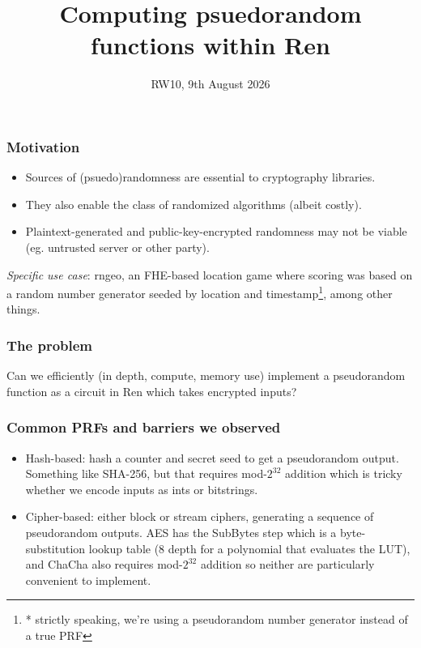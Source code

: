 \documentclass{beamer}
\title{Computing psuedorandom functions within Ren}
\author{}
\institute{Field Extension Institute}
\date{RW10, 9th August 2026}
\begin{document}
\frame{\titlepage}

\begin{frame}
\frametitle{Motivation}
\begin{itemize}[<+->]
    \item Sources of (psuedo)randomness are essential to cryptography libraries.
    \item They also enable the class of randomized algorithms (albeit costly).
    \item Plaintext-generated and public-key-encrypted randomness may not be viable (eg. untrusted server or other party).
\end{itemize}

\pause
\vspace{1cm}
\textit{Specific use case}: rngeo, an FHE-based location game where scoring was based on a random number generator seeded by location and timestamp\footnote{* strictly speaking, we're using a pseudorandom number generator instead of a true PRF}, among other things.


\end{frame}

\begin{frame}
\frametitle{The problem}
Can we efficiently (in depth, compute, memory use) implement a pseudorandom function as a circuit in Ren which takes encrypted inputs?
\end{frame}

\begin{frame}
\frametitle{Common PRFs and barriers we observed}

\begin{itemize}[<+->]
    \item Hash-based: hash a counter and secret seed to get a pseudorandom output. 
    Something like SHA-256, but that requires mod-$2^{32}$ addition which is tricky whether we encode inputs as ints or bitstrings. 
    \item Cipher-based: either block or stream ciphers, generating a sequence of pseudorandom outputs.
    AES has the SubBytes step which is a byte-substitution lookup table (8 depth for a polynomial that evaluates the LUT), and ChaCha also requires mod-$2^{32}$ addition so neither are particularly convenient to implement.
\end{itemize}
\end{frame}
\end{document}
